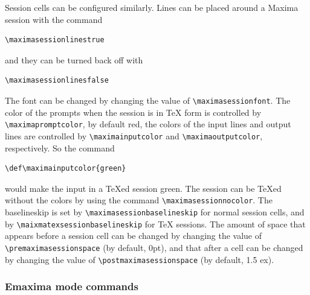 Session cells can be configured similarly.  
Lines can be placed around a Maxima session with the command
\begin{verbatim}
\maximasessionlinestrue
\end{verbatim}
\noindent
and they can be turned back off with
\begin{verbatim}
\maximasessionlinesfalse
\end{verbatim}
\noindent
The font can be changed by changing the value of
\verb+\maximasessionfont+.  The color of the prompts when the session
is in \TeX{} form is controlled by \\
\verb+\maximapromptcolor+, by
default red, the colors of the input lines and output lines are
controlled by \verb+\maximainputcolor+ and \verb+\maximaoutputcolor+,
respectively. So the command
\begin{verbatim}
\def\maximainputcolor{green}
\end{verbatim}
\noindent
would make the input in a \TeX{}ed session green.  
The session can be \TeX{}ed without the colors by using the command
\verb+\maximasessionnocolor+.
The baselineskip is
set by \verb+\maximasessionbaselineskip+ for normal session cells, and
by \verb+\maixmatexsessionbaselineskip+ for \TeX{} sessions.  The
amount of space that appears before a session cell can be changed by
changing the value of \verb+\premaximasessionspace+ (by default, 0pt),
and that after a cell can be changed by changing the value of
\verb+\postmaximasessionspace+ (by default, 1.5 ex).

\subsubsection{Emaxima mode commands}

